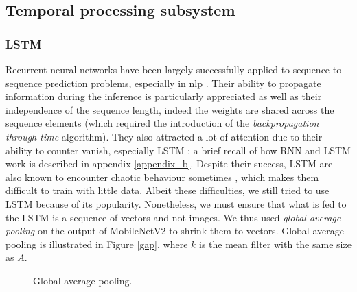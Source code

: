 \documentclass[12pt, a4paper]{report}
\begin{document}
			\subsection{Temporal processing subsystem}\label{subsystems}
				\subsubsection{LSTM}\label{lstm}
					Recurrent neural networks have been largely successfully applied to sequence-to-sequence prediction problems, especially in \gls{nlp} \cite{wu2016google,shen2018natural,miao2020application}.
					Their ability to propagate information during the inference is particularly appreciated as well as their independence of the sequence length, indeed the weights are shared across the sequence elements (which required the introduction of the {\itshape backpropagation through time} algorithm).
					They also attracted a lot of attention due to their ability to counter \gls{vanish}, especially LSTM \cite{Hochreiter1997lstm}; a brief recall of how RNN and LSTM work is described in appendix \ref{appendix_b}.
					Despite their success, LSTM are also known to encounter chaotic behaviour sometimes \cite{bertschinger2004,laurent2016recurrent}, which makes them difficult to train with little data.
					Albeit these difficulties, we still tried to use LSTM because of its popularity.
					Nonetheless, we must ensure that what is fed to the LSTM is a sequence of vectors and not images.
					We thus used {\itshape global average pooling} on the output of MobileNetV2 to shrink them to vectors.
					Global average pooling is illustrated in Figure \ref{gap}, where $k$ is the mean filter with the same size as $A$.
					\begin{figure}[h!]
						\centering
						\caption{Global average pooling.}
					\end{figure}
\end{document}
